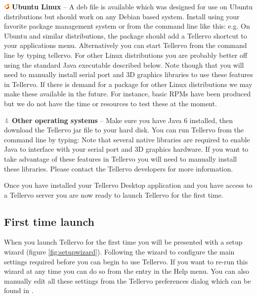 \begin{description}
\item \includegraphics[width=3mm]{Images/ubuntu.png} \textbf{Ubuntu Linux} --  A deb file is available which was designed for use on Ubuntu distributions but should work on any Debian based system. Install using your favorite package management system or from the command line like this: e.g.  On Ubuntu and similar distributions, the package should add a Tellervo shortcut to your applications menu. Alternatively you can start Tellervo from the command line by typing tellervo.  For other Linux distributions you are probably better off using the standard Java executable described below.  Note though that you will need to manually install serial port and 3D graphics libraries to use these features in Tellervo.  If there is demand for a package for other Linux distributions we may make these available in the future.  For instance, basic RPMs have been produced but we do not have the time or resources to test these at the moment.

\item \includegraphics[width=3mm]{Images/java.png} \textbf{Other operating systems} -- Make sure you have Java 6 installed, then download the Tellervo jar file to your hard disk. You can run Tellervo from the command line by typing:   Note that several native libraries are required to enable Java to interface with your serial port and 3D graphics hardware.  If you want to take advantage of these features in Tellervo you will need to manually install these libraries.  Please contact the Tellervo developers for more information.
\end{description}

Once you have installed your Tellervo Desktop application and you have access to a Tellervo server you are now ready to launch Tellervo for the first time.

\subsection{First time launch}
When you launch Tellervo for the first time you will be presented with a setup wizard (figure \ref{fig:setupwizard}).  Following the wizard to configure the main settings required before you can begin to use Tellervo.  If you want to re-run this wizard at any time you can do so from the entry in the Help menu. You can also manually edit all these settings from the Tellervo preferences dialog which can be found in .


